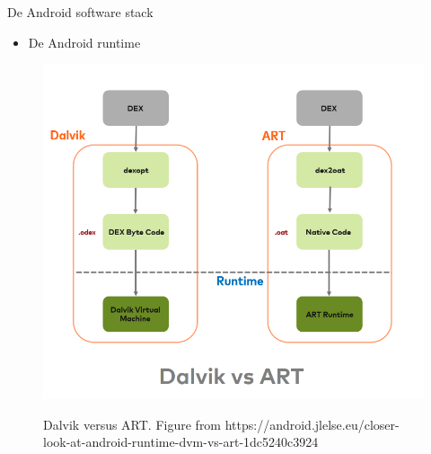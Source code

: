 \documentclass{beamer}
\begin{document}
\begin{frame}{De Android software stack }
\begin{itemize}	
	\item De Android runtime
\end{itemize}
\begin{figure}[ht]
	\centering
	\includegraphics[width=\textwidth]{img/hello/dalvikART.png}
	\label{fig:Dalvik versus ART}
	\caption{Dalvik versus ART. Figure from https://android.jlelse.eu/closer-look-at-android-runtime-dvm-vs-art-1dc5240c3924}
\end{figure}	
\end{frame}
\end{document}
